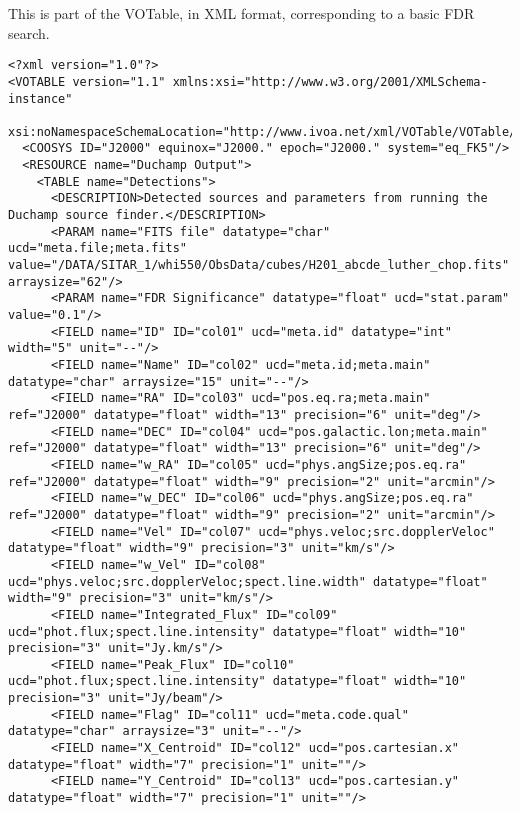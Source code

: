 \begin{landscape}
\label{app-votable}
This is part of the VOTable, in XML format, corresponding to a basic
FDR search.

{\tiny
  \begin{verbatim}
<?xml version="1.0"?>
<VOTABLE version="1.1" xmlns:xsi="http://www.w3.org/2001/XMLSchema-instance"
 xsi:noNamespaceSchemaLocation="http://www.ivoa.net/xml/VOTable/VOTable/v1.1">
  <COOSYS ID="J2000" equinox="J2000." epoch="J2000." system="eq_FK5"/>
  <RESOURCE name="Duchamp Output">
    <TABLE name="Detections">
      <DESCRIPTION>Detected sources and parameters from running the Duchamp source finder.</DESCRIPTION>
      <PARAM name="FITS file" datatype="char" ucd="meta.file;meta.fits" value="/DATA/SITAR_1/whi550/ObsData/cubes/H201_abcde_luther_chop.fits" arraysize="62"/>
      <PARAM name="FDR Significance" datatype="float" ucd="stat.param" value="0.1"/>
      <FIELD name="ID" ID="col01" ucd="meta.id" datatype="int" width="5" unit="--"/>
      <FIELD name="Name" ID="col02" ucd="meta.id;meta.main" datatype="char" arraysize="15" unit="--"/>
      <FIELD name="RA" ID="col03" ucd="pos.eq.ra;meta.main" ref="J2000" datatype="float" width="13" precision="6" unit="deg"/>
      <FIELD name="DEC" ID="col04" ucd="pos.galactic.lon;meta.main" ref="J2000" datatype="float" width="13" precision="6" unit="deg"/>
      <FIELD name="w_RA" ID="col05" ucd="phys.angSize;pos.eq.ra" ref="J2000" datatype="float" width="9" precision="2" unit="arcmin"/>
      <FIELD name="w_DEC" ID="col06" ucd="phys.angSize;pos.eq.ra" ref="J2000" datatype="float" width="9" precision="2" unit="arcmin"/>
      <FIELD name="Vel" ID="col07" ucd="phys.veloc;src.dopplerVeloc" datatype="float" width="9" precision="3" unit="km/s"/>
      <FIELD name="w_Vel" ID="col08" ucd="phys.veloc;src.dopplerVeloc;spect.line.width" datatype="float" width="9" precision="3" unit="km/s"/>
      <FIELD name="Integrated_Flux" ID="col09" ucd="phot.flux;spect.line.intensity" datatype="float" width="10" precision="3" unit="Jy.km/s"/>
      <FIELD name="Peak_Flux" ID="col10" ucd="phot.flux;spect.line.intensity" datatype="float" width="10" precision="3" unit="Jy/beam"/>
      <FIELD name="Flag" ID="col11" ucd="meta.code.qual" datatype="char" arraysize="3" unit="--"/>
      <FIELD name="X_Centroid" ID="col12" ucd="pos.cartesian.x" datatype="float" width="7" precision="1" unit=""/>
      <FIELD name="Y_Centroid" ID="col13" ucd="pos.cartesian.y" datatype="float" width="7" precision="1" unit=""/>

\end{verbatim}}
\end{landscape}
